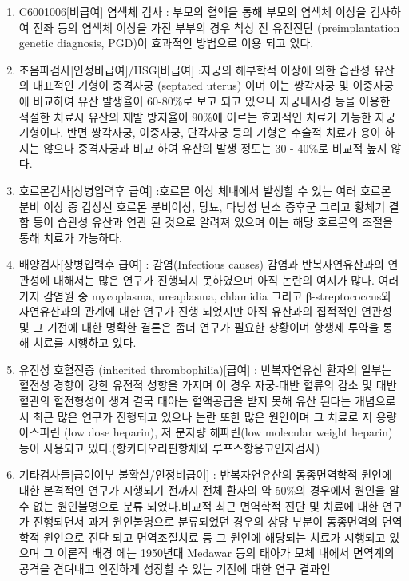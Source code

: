 \begin{enumerate}\tightlist
\item C6001006[비급여] 염색체 검사 : 부모의 혈액을 통해 부모의 염색체 이상을 검사하여  전좌 등의 염색체 이상을 가진 부부의 경우 착상 전 유전진단 (preimplantation genetic diagnosis, PGD)이 효과적인 방법으로 이용 되고 있다.
\item 초음파검사[인정비급여]/HSG[비급여] :자궁의 해부학적 이상에 의한 습관성 유산의 대표적인 기형이 중격자궁 (septated uterus) 이며 이는 쌍각자궁 및 이중자궁에 비교하여 유산 발생율이 60-80\%로 보고 되고 있으나 자궁내시경 등을 이용한 적절한 치료시 유산의 재발 방지율이 90\%에 이르는 효과적인 치료가 가능한 자궁기형이다. 반면 쌍각자궁, 이중자궁, 단각자궁 등의 기형은 수술적 치료가 용이 하지는 않으나 중격자궁과 비교 하여 유산의 발생 정도는 30 - 40\%로 비교적 높지 않다.
\item 호르몬검사[상병입력후 급여] :호르몬 이상 체내에서 발생할 수 있는 여러 호르몬 분비 이상 중 갑상선 호르몬 분비이상, 당뇨, 다낭성 난소 증후군 그리고 황체기 결함 등이 습관성 유산과 연관 된 것으로 알려져 있으며 이는 해당 호르몬의 조절을 통해 치료가 가능하다.
\item 배양검사[상병입력후 급여] : 감염(Infectious causes)
감염과 반복자연유산과의 연관성에 대해서는 많은 연구가 진행되지 못하였으며 아직 논란의 여지가 많다. 여러 가지 감염원 중 mycoplasma, ureaplasma, chlamidia 그리고 β-streptococcus와 자연유산과의 관계에 대한 연구가 진행 되었지만 아직 유산과의 집적적인 연관성 및 그 기전에 대한 명확한 결론은 좀더 연구가 필요한 상황이며 항생제 투약을 통해 치료를 시행하고 있다.
\item 유전성 호혈전증 (inherited thrombophilia)[급여] : 반복자연유산 환자의 일부는 혈전성 경향이 강한 유전적 성향을 가지며 이 경우 자궁-태반 혈류의 감소 및
태반혈관의 혈전형성이 생겨 결국 태아는 혈액공급을 받지 못해 유산 된다는 개념으로서 최근 많은 연구가 진행되고 있으나 논란 또한 많은 원인이며 그 치료로 저 용량 아스피린 (low dose heparin), 저 분자량 헤파린(low molecular weight heparin) 등이 사용되고 있다.(항카디오리핀항체와 루프스항응고인자검사)
\item 기타검사들[급여여부 불확실/인정비급여] : 반복자연유산의 동종면역학적 원인에 대한 본격적인 연구가 시행되기 전까지 전체 환자의 약 50\%의 경우에서 원인을 알 수 없는 원인불명으로 분류 되었다.비교적 최근 면역학적 진단 및 치료에 대한 연구가 진행되면서 과거 원인불명으로 분류되었던 경우의 상당 부분이 동종면역의 면역학적 원인으로 진단 되고 면역조절치료 등 그 원인에 해당되는 치료가 시행되고 있으며 그 이론적 배경 에는 1950년대 Medawar 등의 태아가 모체 내에서 면역계의 공격을 견뎌내고 안전하게 성장할 수 있는 기전에 대한 연구 결과인

\end{enumerate}
